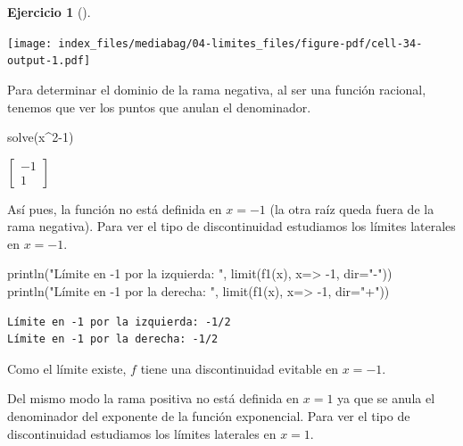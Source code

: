 \documentclass[
  a4paper,
]{scrreport}
\newenvironment{Shaded}{\begin{snugshade}}{\end{snugshade}}
\newcommand{\FloatTok}[1]{\textcolor[rgb]{0.68,0.00,0.00}{#1}}
\newcommand{\FunctionTok}[1]{\textcolor[rgb]{0.28,0.35,0.67}{#1}}
\newcommand{\NormalTok}[1]{\textcolor[rgb]{0.00,0.23,0.31}{#1}}
\newcommand{\OperatorTok}[1]{\textcolor[rgb]{0.37,0.37,0.37}{#1}}
\newcommand{\StringTok}[1]{\textcolor[rgb]{0.13,0.47,0.30}{#1}}
\theoremstyle{definition}
\newtheorem{exercise}{Ejercicio}[chapter]
\theoremstyle{remark}
\begin{document}
\begin{exercise}[]
\begin{tcolorbox}
\texttt{[image: index\_files/mediabag/04-limites\_files/figure-pdf/cell-34-output-1.pdf]}

Para determinar el dominio de la rama negativa, al ser una función
racional, tenemos que ver los puntos que anulan el denominador.

\begin{Shaded}
\begin{Highlighting}[]
\FunctionTok{solve}\NormalTok{(x}\OperatorTok{\^{}}\FloatTok{2}\OperatorTok{{-}}\FloatTok{1}\NormalTok{)}
\end{Highlighting}
\end{Shaded}

$\left[\begin{smallmatrix}-1\\1\end{smallmatrix}\right]$

Así pues, la función no está definida en \(x=-1\) (la otra raíz queda
fuera de la rama negativa). Para ver el tipo de discontinuidad
estudiamos los límites laterales en \(x=-1\).

\begin{Shaded}
\begin{Highlighting}[]
\FunctionTok{println}\NormalTok{(}\StringTok{"Límite en {-}1 por la izquierda: "}\NormalTok{, }\FunctionTok{limit}\NormalTok{(}\FunctionTok{f1}\NormalTok{(x), x}\OperatorTok{=\textgreater{}} \OperatorTok{{-}}\FloatTok{1}\NormalTok{, dir}\OperatorTok{=}\StringTok{"{-}"}\NormalTok{))}
\FunctionTok{println}\NormalTok{(}\StringTok{"Límite en {-}1 por la derecha: "}\NormalTok{, }\FunctionTok{limit}\NormalTok{(}\FunctionTok{f1}\NormalTok{(x), x}\OperatorTok{=\textgreater{}} \OperatorTok{{-}}\FloatTok{1}\NormalTok{, dir}\OperatorTok{=}\StringTok{"+"}\NormalTok{))}
\end{Highlighting}
\end{Shaded}

\begin{verbatim}
Límite en -1 por la izquierda: -1/2
Límite en -1 por la derecha: -1/2
\end{verbatim}

Como el límite existe, \(f\) tiene una discontinuidad evitable en
\(x=-1\).

Del mismo modo la rama positiva no está definida en \(x=1\) ya que se
anula el denominador del exponente de la función exponencial. Para ver
el tipo de discontinuidad estudiamos los límites laterales en \(x=1\).


\end{tcolorbox}
\end{exercise}
\end{document}
